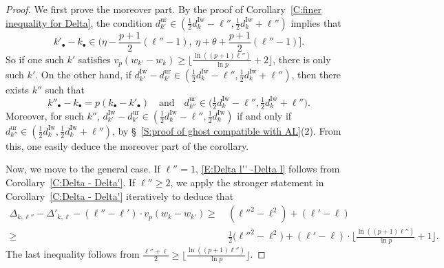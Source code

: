 \documentclass[12pt]{amsart}
\theoremstyle{definition}
\numberwithin{equation}{subsection}
\newcommand{\Iw}{\mathrm{Iw}}
\newcommand{\ur}{\mathrm{ur}}
\begin{document}
\begin{proof}
We first prove the moreover part. By the proof of Corollary~\ref{C:finer inequality for Delta}, the condition $d_{k'}^\ur \in (\frac 12d_k^\Iw - \ell'', \frac 12d_k^\Iw+\ell'')$ implies that
$$
k'_\bullet - k_\bullet \in \Big( \eta-\frac{p+1}2(\ell''-1), \ \eta+\theta + \frac{p+1}2 (\ell''-1)\Big].
$$
So if one such $k'$ satisfies $v_p(w_{k'}-w_k) \geq \big\lfloor \frac{\ln((p+1)\ell'')}{\ln p}+2\big\rfloor $, there is only such $k'$.  On the other hand, if $d_{k'}^\Iw - d_{k'}^\ur \in (\frac 12d_k^\Iw - \ell'', \frac 12d_k^\Iw+\ell'')$, then there exists $k''$ such that
$$
k''_\bullet - k_\bullet = p(k_\bullet - k'_\bullet) \quad \textrm{and} \quad d_{k''}^\ur \in \big(\tfrac 12d_k^\Iw - \ell'', \tfrac 12d_k^\Iw+\ell''\big).
$$
Moreover, for such $k''$, $d_{k'}^\Iw-d_{k'}^\ur \in (\frac 12d_k^\Iw - \ell'', \frac 12d_k^\Iw)$ if and only if $d_{k''}^\ur \in (\frac 12d_k^\Iw, \frac 12d_k^\Iw + \ell'')$, by \S~\ref{S:proof of ghost compatible with AL}(2). From this, one easily deduce the moreover part of the corollary.

Now, we move to the general case.
If $\ell'' = 1$, \eqref{E:Delta l'' -Delta l} follows from Corollary~\ref{C:Delta - Delta'}.
If $\ell'' \geq 2$, we apply the stronger statement in  Corollary~\ref{C:Delta - Delta'} iteratively to deduce that
\begin{align*}
\Delta_{k, \ell''}-\Delta'_{k,\ell} - (\ell''-\ell')\cdot v_p(w_k-w_{k'}) \geq\ & (\ell''^2-\ell^2) + (\ell'-\ell)
\\
\geq\ & \frac 12\big( \ell''^2 - \ell^2\big)+ (\ell'-\ell) \cdot \Big\lfloor \frac{\ln((p+1)\ell'')}{\ln p}+1\Big\rfloor.
\end{align*}
The last inequality follows from $\frac{\ell''+\ell}2 \geq \big\lfloor \frac{\ln((p+1)\ell'')}{\ln p}\big\rfloor$.
\end{proof}
\end{document}
